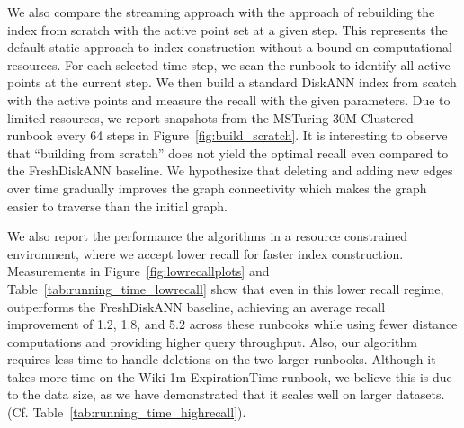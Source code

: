 We also compare the streaming approach with the approach of rebuilding the
index from scratch with the active point set at a given step.
This represents the default static approach to index construction
without a bound on computational resources.
For each selected time step,
we scan the runbook to identify all active points at the current step.
We then build a standard DiskANN index from scatch with the active points and measure 
the recall with the given parameters.
Due to limited resources, we report snapshots
from the MSTuring-30M-Clustered runbook every 64 steps in Figure~\ref{fig:build_scratch}.
It is interesting to observe that ``building from scratch'' does not yield
the optimal recall even compared to the FreshDiskANN baseline.
We hypothesize that deleting and adding new edges over time gradually
improves the graph connectivity which makes the graph easier to traverse than the initial graph.




We also report the performance the algorithms in a resource constrained environment,
where we accept lower recall for faster index construction.
Measurements in Figure~\ref{fig:lowrecallplots} and Table~\ref{tab:running_time_lowrecall}
show that even in this lower recall regime, \name outperforms the FreshDiskANN baseline, 
achieving an average recall improvement of 1.2, 1.8, and 5.2 across these runbooks while using fewer distance computations 
and providing higher query throughput. 
Also, our algorithm requires less time to handle deletions on the two larger runbooks. 
Although it takes more time on the Wiki-1m-ExpirationTime runbook, we believe this is due to the data size, as we have demonstrated that it scales well on larger datasets. (Cf. Table~\ref{tab:running_time_highrecall}).

